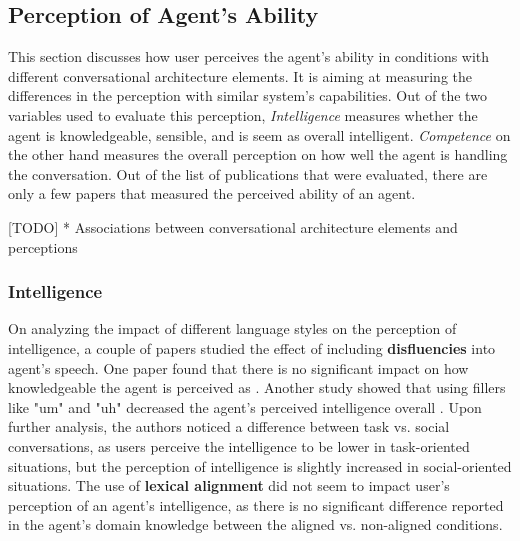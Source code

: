 \documentclass[sigconf,screen,review, anonymous]{acmart}
\newcommand{\cmt}[1]{}%
\begin{document}
%



\subsection{Perception of Agent's Ability}

This section discusses how user perceives the agent's ability in conditions with different conversational architecture elements. It is aiming at measuring the differences in the perception with similar system's capabilities. Out of the two variables used to evaluate this perception, \textit{Intelligence} measures whether the agent is knowledgeable, sensible, and is seem as overall intelligent. \textit{Competence} on the other hand measures the overall perception on how well the agent is handling the conversation. Out of the list of publications that were evaluated, there are only a few papers that measured the perceived ability of an agent.

[TODO] * Associations between conversational architecture elements and perceptions

\subsubsection{Intelligence}

On analyzing the impact of different language styles on the perception of intelligence, a couple of papers studied the effect of including \textbf{disfluencies} into agent's speech. One paper found that there is no significant impact on how knowledgeable the agent is perceived as \cite{pfeifer2009should}\cmt{[12]}. Another study showed that using fillers like "um" and "uh" decreased the agent's perceived intelligence overall \cite{jeong2019exploring}\cmt{[10]}. Upon further analysis, the authors noticed a difference between task vs. social conversations, as users perceive the intelligence to be lower in task-oriented situations, but the perception of intelligence is slightly increased in social-oriented situations. The use of \textbf{lexical alignment} did not seem to impact user's perception of an agent's intelligence, as there is no significant difference reported in the agent's domain knowledge between the aligned vs. non-aligned conditions.
\end{document}
